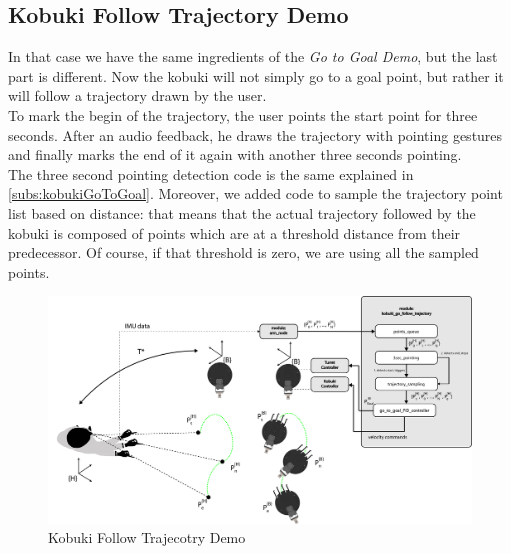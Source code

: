 \subsection{Kobuki Follow Trajectory Demo}
In that case we have the same ingredients of the \emph{Go to Goal Demo}, but the last part is different. Now the kobuki will not simply go to a goal point, but rather it will follow a trajectory drawn by the user.\\
To mark the begin of the trajectory, the user points the start point for three seconds. After an audio feedback, he draws the trajectory with pointing gestures and finally marks the end of it again with another three seconds pointing.\\
The three second pointing detection code is the same explained in \ref{subs:kobukiGoToGoal}. Moreover, we added code to sample the trajectory point list based on distance: that means that the actual trajectory followed by the kobuki is composed of points which are at a threshold distance from their predecessor. Of course, if that threshold is zero, we are using all the sampled points.
\begin{figure}
	\centering
	\includegraphics[width=\textwidth]{img/followTrajectorySW.png}%
	\caption{Kobuki Follow Trajecotry Demo}
	\label{fig:followTrajectoryDemo}
\end{figure}

